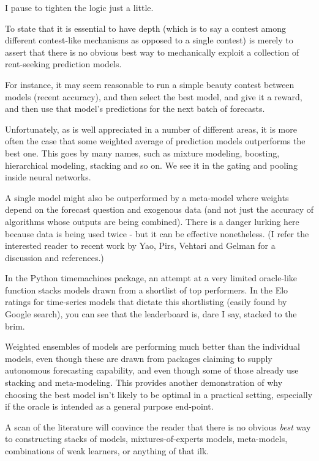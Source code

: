 I pause to tighten the logic just a little. 

To state that it is essential to have depth (which is to say a contest among different contest-like mechanisms as opposed to a single contest) is merely to assert that there is no obvious best way to mechanically exploit a collection of rent-seeking prediction models. 

For instance, it may seem reasonable to run a simple beauty contest between models (recent accuracy), and then select the best model, and give it a reward, and then use that model's predictions for the next batch of forecasts. 

Unfortunately, as is well appreciated in a number of different areas, it is more often the case that some weighted average of prediction models outperforms the best one. This goes by many names, such as mixture modeling, boosting, hierarchical modeling, stacking and so on. We see it in the gating and pooling inside neural networks. 

A single model might also be outperformed by a meta-model where weights depend on the forecast question and exogenous data (and not just the accuracy of algorithms whose outputs are being combined). There is a danger lurking here because data is being used twice - but it can be effective nonetheless. (I refer the interested reader to recent work by Yao, Pirs, Vehtari and Gelman for a discussion and references.) 

In the Python timemachines package, an attempt at a very limited oracle-like function stacks models drawn from a shortlist of top performers. In the Elo ratings for time-series models that dictate this shortlisting (easily found by Google search), you can see that the leaderboard is, dare I say, stacked to the brim. 

Weighted ensembles of models are performing much better than the individual models, even though these are drawn from packages claiming to supply autonomous forecasting capability, and even though some of those already use stacking and meta-modeling. This provides another demonstration of why choosing the best model isn't likely to be optimal in a practical setting, especially if the oracle is intended as a general purpose end-point.  

A scan of the literature will convince the reader that there is no obvious {\em best} way to constructing stacks of models, mixtures-of-experts models, meta-models, combinations of weak learners, or anything of that ilk. 

